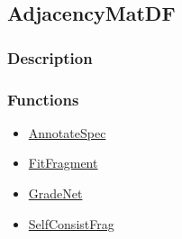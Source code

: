 \subsection{AdjacencyMatDF}\label{AdjacencyMatDF}
\subsubsection{Description}


\subsubsection{Functions}
\begin{itemize}
\item \hyperref[AnnotateSpec]{AnnotateSpec}
\item \hyperref[FitFragment]{FitFragment}
\item \hyperref[GradeNet]{GradeNet}
\item \hyperref[SelfConsistFrag]{SelfConsistFrag}
\end{itemize}

